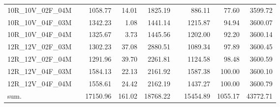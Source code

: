 \begin{tabular}{llrrrlrrr}
10R\_10V\_02F\_04M & \hspace{0.1cm} & 1058.77 & 14.01 & 1825.19 & \hspace{0.2cm} & 886.11 & 77.60 & 3599.72\\
10R\_10V\_04F\_03M & \hspace{0.1cm} & 1342.23 & 1.08 & 1441.14 & \hspace{0.2cm} & 1215.87 & 94.94 & 3600.07\\
10R\_10V\_04F\_04M & \hspace{0.1cm} & 1325.67 & 3.73 & 1445.56 & \hspace{0.2cm} & 1202.00 & 92.20 & 3600.14\\
\addlinespace
12R\_12V\_02F\_03M & \hspace{0.1cm} & 1302.23 & 37.08 & 2880.51 & \hspace{0.2cm} & 1089.34 & 97.89 & 3600.45\\
12R\_12V\_02F\_04M & \hspace{0.1cm} & 1291.96 & 39.70 & 2261.81 & \hspace{0.2cm} & 1124.58 & 98.48 & 3600.59\\
12R\_12V\_04F\_03M & \hspace{0.1cm} & 1584.13 & 22.13 & 2161.92 & \hspace{0.2cm} & 1587.38 & 100.00 & 3600.10\\
12R\_12V\_04F\_04M & \hspace{0.1cm} & 1558.61 & 24.42 & 2162.19 & \hspace{0.2cm} & 1437.27 & 100.00 & 3600.79\\
\addlinespace
sum. & \hspace{0.1cm} & 17150.96 & 161.02 & 18768.22 & \hspace{0.2cm} & 15454.89 & 1055.17 & 43772.71\\
\bottomrule
\end{tabular}
